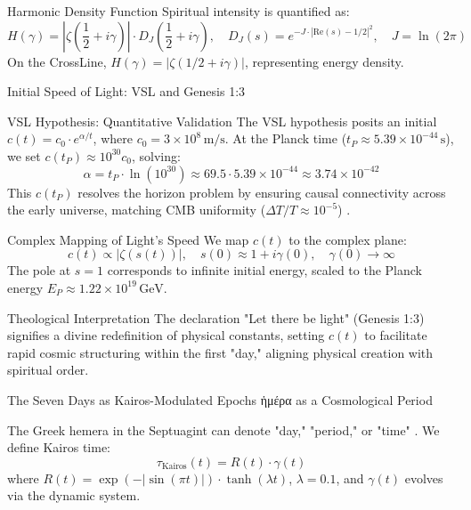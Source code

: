 \documentclass[12pt]{article}
\begin{document}
{{{ Harmonic Density Function
Spiritual intensity is quantified as:
\[
H(\gamma) = \left| \zeta\left(\frac{1}{2} + i \gamma\right) \right| \cdot D_J\left(\frac{1}{2} + i \gamma\right), \quad D_J(s) = e^{-J \cdot |\text{Re}(s) - 1/2|^2}, \quad J = \ln(2\pi)
\]
On the CrossLine, \( H(\gamma) = |\zeta(1/2 + i\gamma)| \), representing energy density.

 Initial Speed of Light: VSL and Genesis 1:3

 VSL Hypothesis: Quantitative Validation
The VSL hypothesis posits an initial \( c(t) = c_0 \cdot e^{\alpha / t} \), where \( c_0 = 3 \times 10^8 \, \text{m/s} \). At the Planck time (\( t_P \approx 5.39 \times 10^{-44} \, \text{s} \)), we set \( c(t_P) \approx 10^{30} c_0 \), solving:
\[
\alpha = t_P \cdot \ln(10^{30}) \approx 69.5 \cdot 5.39 \times 10^{-44} \approx 3.74 \times 10^{-42}
\]
This \( c(t_P) \) resolves the horizon problem by ensuring causal connectivity across the early universe, matching CMB uniformity (\(\Delta T/T \approx 10^{-5}\)) \cite{Albrecht1999}.

 Complex Mapping of Light’s Speed
We map \( c(t) \) to the complex plane:
\[
c(t) \propto |\zeta(s(t))|, \quad s(0) \approx 1 + i \gamma(0), \quad \gamma(0) \to \infty
\]
The pole at \( s = 1 \) corresponds to infinite initial energy, scaled to the Planck energy \( E_P \approx 1.22 \times 10^{19} \, \text{GeV} \).

 Theological Interpretation
The declaration "Let there be light" (Genesis 1:3) signifies a divine redefinition of physical constants, setting \( c(t) \) to facilitate rapid cosmic structuring within the first "day," aligning physical creation with spiritual order.

 The Seven Days as Kairos-Modulated Epochs
\textgreek{ἡμέρα}
 as a Cosmological Period

The Greek hemera in the Septuagint can denote "day," "period," or "time" \cite{LXXGenesis}. We define Kairos time:
\[
\tau_{\text{Kairos}}(t) = R(t) \cdot \gamma(t)
\]
where \( R(t) = \exp(-|\sin(\pi t)|) \cdot \tanh(\lambda t) \), \(\lambda = 0.1\), and \(\gamma(t)\) evolves via the dynamic system.

}}}
\end{document}
